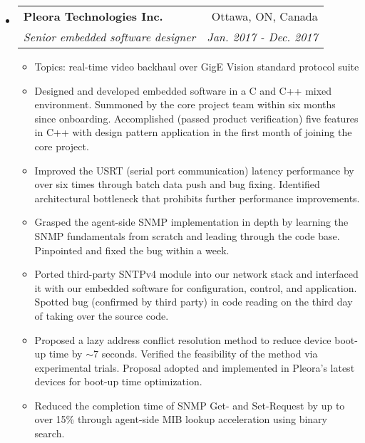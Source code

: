 \documentclass[letterpaper,11pt]{article}
\makeatletter
\newcommand{\ressubheading}[4]{
\begin{tabular*}{6.69in}{l@{\extracolsep{\fill}}r}
        \textbf{#1} & #2 \\
        \textit{#3} & \textit{#4} \\
\end{tabular*}\vspace{-6pt}
}
\newcommand{\resitem}[1]{\item #1 \vspace{-2pt}}
\makeatother
\begin{document}
\begin{CJK}{UTF8}{gbsn}
\begin{itemize}
\item
  \ressubheading{Pleora Technologies Inc.}{Ottawa, ON, Canada}
  {Senior embedded software designer}{Jan. 2017 - Dec. 2017}
  \begin{itemize}
    \resitem{Topics: real-time video backhaul over GigE Vision standard protocol suite}
    \resitem{Designed and developed embedded software in a C and C++ mixed environment. Summoned by the core project team within six months since onboarding.
    Accomplished (passed product verification) five features in C++ with design pattern application in the first month of joining the core project.}
    \resitem{Improved the USRT (serial port communication) latency performance by over six times through batch data push and bug fixing.
    Identified architectural bottleneck that prohibits further performance improvements.}
    \resitem{Grasped the agent-side SNMP implementation in depth by learning the SNMP fundamentals from scratch
    and leading through the code base. Pinpointed and fixed the bug within a week.}
    \resitem{Ported third-party SNTPv4 module into our network stack and interfaced it with our embedded software for configuration, control, and application.
    Spotted bug (confirmed by third party) in code reading on the third day of taking over the source code.}
    \resitem{Proposed a lazy address conflict resolution method to reduce device boot-up time by $\sim$7 seconds.
    Verified the feasibility of the method via experimental trials.
    Proposal adopted and implemented in Pleora's latest devices for boot-up time optimization.}
    \resitem{Reduced the completion time of SNMP Get- and Set-Request by up to over 15\% through agent-side MIB lookup acceleration using binary search.}
  \end{itemize}


\end{itemize}
\end{CJK}
\end{document}
